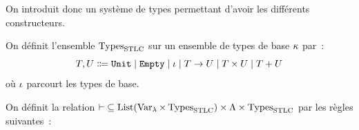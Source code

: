 On introduit donc un système de types permettant d'avoir les différents
constructeurs.

\begin{definition}
  On définit l'ensemble $\tySTLC$ sur un ensemble de types de base $\kappa$ par~:
  \[\varTypA,\varTypB \inddefeq \unitT\mid\emptyT\mid \varTypBa \mid
  \varTypA \to \varTypB \mid \varTypA\times \varTypB \mid \varTypA + \varTypB\]
  où $\iota$ parcourt les types de base.
  \index[notation]{$\tySTLC$}
\end{definition}

\begin{definition}
  On définit la relation
  $\mathord{\mathrel{\vdash}}\subseteq\operatorname{List}(\operatorname{Var}_{\lambda}\times\operatorname{Types}_{\mathrm{STLC}})\times\Lambda\times\operatorname{Types}_{\mathrm{STLC}}$
  par les règles suivantes~:
  \begin{center}
\end{center}
\end{definition}
